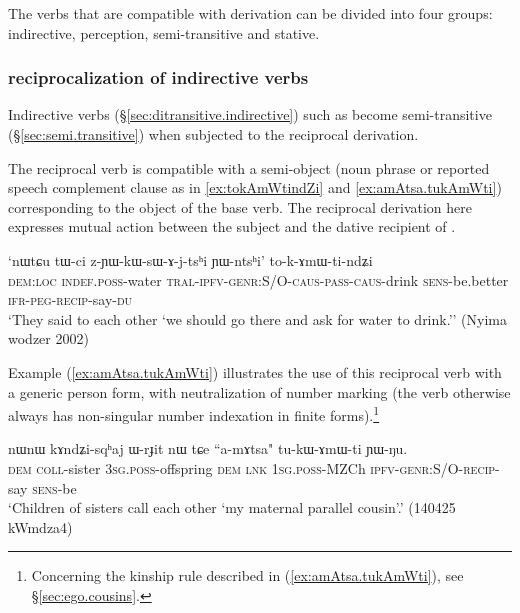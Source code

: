 The verbs that are compatible with  derivation can be divided into four groups: indirective, perception, semi-transitive and stative.

\subsubsection{ reciprocalization of indirective verbs} \label{sec:recip.amW.indirective}
Indirective verbs (§\ref{sec:ditransitive.indirective}) such as  become semi-transitive (§\ref{sec:semi.transitive}) when subjected to the  reciprocal derivation. 

The reciprocal verb  is compatible with a semi-object (noun phrase or reported speech complement clause as in \ref{ex:tokAmWtindZi} and \ref{ex:amAtsa.tukAmWti}) corresponding to the object of the base verb. The reciprocal derivation here expresses mutual action between the subject and the dative recipient of . 

\begin{exe}
\ex \label{ex:tokAmWtindZi}
\gll `nɯtɕu tɯ-ci z-ɲɯ-kɯ-sɯ-ɤ-j-tsʰi ɲɯ-ntsʰi' to-k-ɤmɯ-ti-ndʑi \\
\textsc{dem}:\textsc{loc} \textsc{indef}.\textsc{poss}-water \textsc{tral}-\textsc{ipfv}-\textsc{genr}:S/O-\textsc{caus}-\textsc{pass}-\textsc{caus}-drink \textsc{sens}-be.better \textsc{ifr}-\textsc{peg}-\textsc{recip}-say-\textsc{du} \\
\glt `They said to each other `we should go there and ask for water to drink.'' (Nyima wodzer 2002)
\end{exe}

Example (\ref{ex:amAtsa.tukAmWti}) illustrates the use of this reciprocal verb with a generic person form, with neutralization of number marking (the verb otherwise always has non-singular number indexation in finite forms).\footnote{Concerning the kinship rule described in (\ref{ex:amAtsa.tukAmWti}), see §\ref{sec:ego.cousins}. }

\begin{exe}
\ex \label{ex:amAtsa.tukAmWti}
\gll nɯnɯ kɤndʑi-sqʰaj ɯ-rɟit nɯ tɕe ``a-mɤtsa" tu-kɯ-ɤmɯ-ti ɲɯ-ŋu. \\
\textsc{dem} \textsc{coll}-sister \textsc{3sg}.\textsc{poss}-offspring \textsc{dem} \textsc{lnk} \textsc{1sg}.\textsc{poss}-MZCh \textsc{ipfv}-\textsc{genr}:S/O-\textsc{recip}-say \textsc{sens}-be \\
\glt `Children of sisters call each other `my maternal parallel cousin'.' (140425 kWmdza4)
\end{exe}

